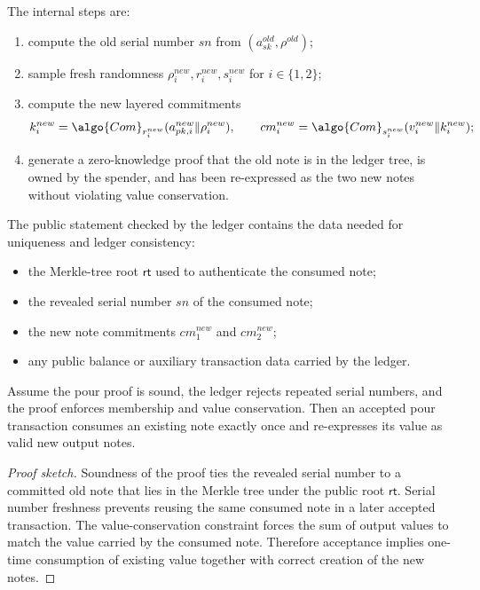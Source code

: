 \documentclass[11pt]{article}
\newcommand{\Com}{\algo{Com}}
\begin{document}
The internal steps are:
\begin{enumerate}
  \item compute the old serial number $sn$ from $(a_{sk}^{old}, \rho^{old})$;
  \item sample fresh randomness $\rho_i^{new}, r_i^{new}, s_i^{new}$ for
        $i \in \{1,2\}$;
  \item compute the new layered commitments
        \[
          k_i^{new} = \Com_{r_i^{new}}(a_{pk,i}^{new}\|\rho_i^{new}),
          \qquad
          cm_i^{new} = \Com_{s_i^{new}}(v_i^{new}\|k_i^{new});
        \]
  \item generate a zero-knowledge proof that the old note is in the ledger
        tree, is owned by the spender, and has been re-expressed as the two new
        notes without violating value conservation.
\end{enumerate}

\begin{highlight}[title={Public Inputs in a Simplified Pour Proof}]
The public statement checked by the ledger contains the data needed for
uniqueness and ledger consistency:
\begin{itemize}
  \item the Merkle-tree root $\mathsf{rt}$ used to authenticate the consumed note;
  \item the revealed serial number $sn$ of the consumed note;
  \item the new note commitments $cm_1^{new}$ and $cm_2^{new}$;
  \item any public balance or auxiliary transaction data carried by the ledger.
\end{itemize}
\end{highlight}

\begin{proposition}
Assume the pour proof is sound, the ledger rejects repeated serial numbers, and
the proof enforces membership and value conservation.  Then an accepted pour
transaction consumes an existing note exactly once and re-expresses its value
as valid new output notes.
\end{proposition}

\begin{proof}[Proof sketch]
Soundness of the proof ties the revealed serial number to a committed old note
that lies in the Merkle tree under the public root $\mathsf{rt}$.  Serial
number freshness prevents reusing the same consumed note in a later accepted
transaction.  The value-conservation constraint forces the sum of output values
to match the value carried by the consumed note.  Therefore acceptance implies
one-time consumption of existing value together with correct creation of the new
notes.
\end{proof}
\end{document}
